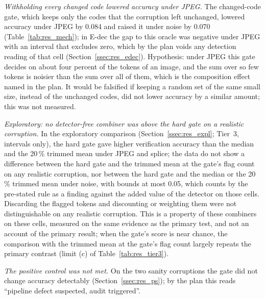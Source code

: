 \emph{Withholding every changed code lowered accuracy under JPEG.}
The changed-code gate, which keeps only the codes that the corruption left unchanged, lowered accuracy under JPEG by 0.084 and raised it
under noise by 0.070 (Table~\ref{tab:res_mech}); in E-dec the gap to this oracle was negative under JPEG with an interval that excludes
zero, which by the plan voids any detection reading of that cell (Section~\ref{ssec:res_edec}).
Hypothesis: under JPEG this gate decides on about four percent of the tokens of an image, and the sum over so few tokens is noisier than
the sum over all of them, which is the composition effect named in the plan.
It would be falsified if keeping a random set of the same small size, instead of the unchanged codes, did not lower accuracy by a similar
amount; this was not measured.

\emph{Exploratory: no detector-free combiner was above the hard gate on a realistic corruption.}
In the exploratory comparison (Section~\ref{ssec:res_expl}; Tier~3, intervals only), the hard gate gave higher verification accuracy
than the median and the 20\,\% trimmed mean under JPEG and splice; the data do not show a difference between the hard gate and the
trimmed mean at the gate's flag count on any realistic corruption, nor between the hard gate and the median or the 20\,\% trimmed mean
under noise, with bounds at most 0.05, which counts by the pre-stated rule as a finding against the added value of the detector on those
cells.
Discarding the flagged tokens and discounting or weighting them were not distinguishable on any realistic corruption.
This is a property of these combiners on these cells, measured on the same evidence as the primary test, and not an account of the
primary result; when the gate's score is near chance, the comparison with the trimmed mean at the gate's flag count largely repeats the
primary contrast (limit (c) of Table~\ref{tab:res_tier3}).

\emph{The positive control was not met.}
On the two sanity corruptions the gate did not change accuracy detectably (Section~\ref{ssec:res_ps}); by the plan this reads ``pipeline defect suspected, audit triggered''.

